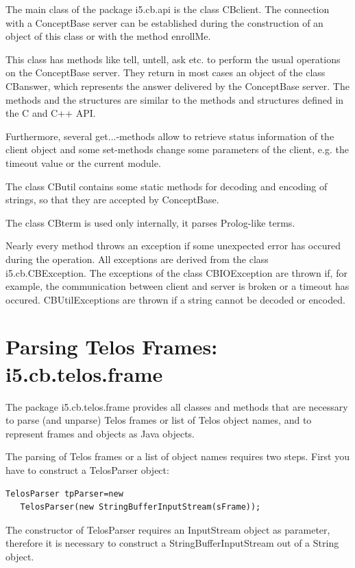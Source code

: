 The main class of the package {\ttfamily i5.cb.api} is the class
{\ttfamily CBclient}. The connection with a ConceptBase server can
be established during the construction of an object of this
class or with the method {\ttfamily enrollMe}.

This class has methods like {\ttfamily tell}, {\ttfamily untell}, {\ttfamily ask} etc.
to perform the usual operations on the ConceptBase server.
They return in most cases an object of the class CBanswer,
which represents the answer delivered by the ConceptBase
server. The methods and the structures are similar to
the methods and structures defined in the C and C++
API.

Furthermore, several get...-methods allow to retrieve
status information of the client object and some
set-methods change some parameters of the client,
e.g. the timeout value or the current module.

The class CButil contains some static methods for
decoding and encoding of strings, so that they
are accepted by ConceptBase.

The class CBterm is used only internally, it parses
Prolog-like terms.

Nearly every method throws an exception if some
unexpected error has occured during the operation.
All exceptions are derived from the class
i5.cb.CBException. The exceptions of the
class CBIOException are thrown if, for example,
the communication between client and
server is broken or a timeout has occured.
CBUtilExceptions are thrown if a string
cannot be decoded or encoded.


\section{Parsing Telos Frames: i5.cb.telos.frame}

The package i5.cb.telos.frame provides all classes and
methods that are necessary to parse (and unparse)
Telos frames or list of Telos object names, and to
represent frames and objects as Java objects.

The parsing of Telos frames or a list of object names
requires two steps. First you have to construct a
TelosParser object:

\begin{verbatim}
TelosParser tpParser=new
   TelosParser(new StringBufferInputStream(sFrame));
\end{verbatim}

The constructor of TelosParser requires an InputStream
object as parameter, therefore it is necessary to construct
a StringBufferInputStream out of a String object.

